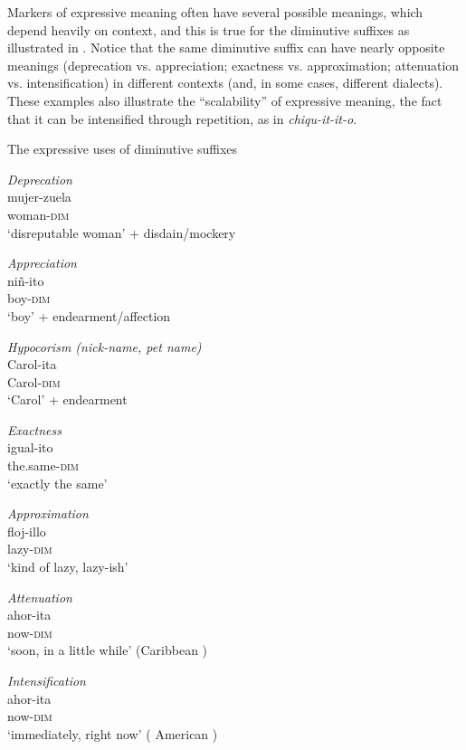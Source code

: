Markers of expressive meaning often have several possible meanings, which depend heavily on context, and this is true for the  diminutive suffixes as illustrated in 
.
Notice that the same diminutive suffix can have nearly opposite meanings (deprecation vs. appreciation; exactness vs. approximation; attenuation vs. intensification) in different contexts (and, in some cases, different dialects). These examples also illustrate the “scalability” of expressive meaning, the fact that it can be intensified through repetition, as in \textit{chiqu-it-it-o}.

\ea \label{ex:2.21}
The expressive uses of  diminutive suffixes \citep{Fortin2011}

\ea \emph{Deprecation}\\
\gll mujer-zuela\\
woman\textsc{-dim}\\
\glt  ‘disreputable woman’ + disdain/mockery

\ex \emph{Appreciation}\\
\gll niñ-ito\\
boy-\textsc{dim}\\
\glt  ‘boy’ + endearment/affection

\ex  \emph{Hypocorism (nick-name, pet name)}\\
\gll Carol-ita\\
     Carol-\textsc{dim}\\
\glt ‘Carol’ + endearment

\ex \emph{Exactness}\\
\gll igual-ito\\
     the.same-\textsc{dim}\\
\glt ‘exactly the same’

\ex \emph{Approximation}\\
\gll floj-illo\\
      lazy-\textsc{dim}\\
\glt ‘kind of lazy, lazy-ish’

\ex \emph{Attenuation}\\
\gll ahor-ita\\
     now-\textsc{dim}\\
\glt ‘soon, in a little while’ (Caribbean )

\ex \emph{Intensification}\\
\ea
\gll ahor-ita\\ 
     now-\textsc{dim}\\
\glt ‘immediately, right now’ ( American )


